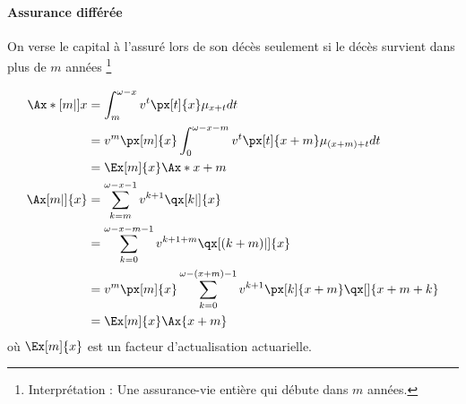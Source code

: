 \documentclass[10pt, french]{article}
\begin{document}
\begin{multicols*}{3}
\paragraph{Assurance différée} On verse le capital à l'assuré lors de son décès seulement si le décès survient dans plus de $m$ années \footnote{Interprétation : Une assurance-vie entière qui débute dans $m$ années.}

\begin{align*}
\Ax*[m|]{x}	& = \int_{m}^{\omega -x} v^t \px[t]{x} \mu_{x+t} dt \\
	& = v^m \px[m]{x} \int_{0}^{\omega - x - m} v^t \px[t]{x+m} \mu_{(x+m)+t} dt \\
	& = \Ex[m]{x} \Ax*{x+m} \\
\Ax[m|]{x}	& = \sum_{k=m}^{\omega - x -1} v^{k+1} \qx[k|]{x} \\
	& = \sum_{k=0}^{\omega - x - m - 1} v^{k+1+m} \qx[(k+m)|]{x} \\
	& = v^m \px[m]{x} \sum_{k=0}^{\omega - (x+m) - 1} v^{k+1} \px[k]{x+m} \qx[]{x+m+k} \\
	& = \Ex[m]{x} \Ax{x+m} \\
\end{align*}
où $\Ex[m]{x}$ est un facteur d'actualisation actuarielle.






\end{multicols*}
\end{document}
